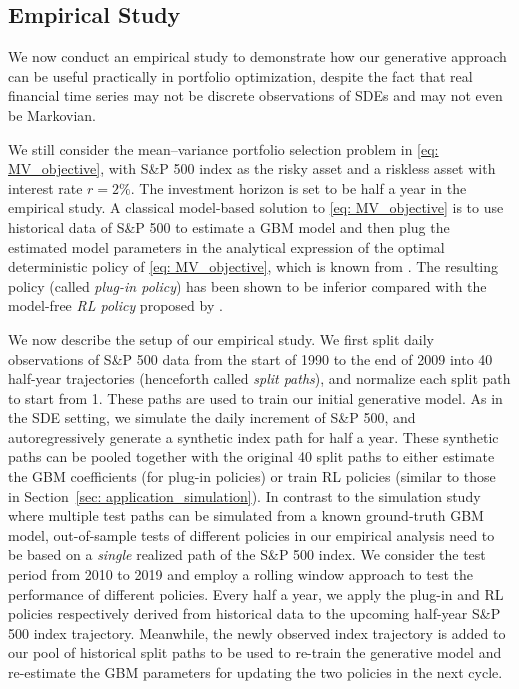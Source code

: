 \documentclass[11pt]{article}
\begin{document}
\subsection{Empirical Study}\label{sec: application_empirical}

We now conduct an empirical study to demonstrate how our generative approach can be useful practically in portfolio optimization, despite the fact that real financial time series may not be discrete observations of SDEs and may not even be Markovian.


We still consider the mean--variance portfolio selection problem in \eqref{eq: MV_objective}, with S\&P 500 index as the risky asset and a riskless asset with interest rate $r= 2\%$. The investment horizon is set to be half a year in the empirical study.
A classical model-based solution to \eqref{eq: MV_objective} is to use historical data of S\&P 500 to estimate a GBM model and then plug the estimated model parameters in the analytical expression of the optimal deterministic policy of \eqref{eq: MV_objective}, which is known from \cite{zhou2000continuous}. The resulting policy (called  \textit{plug-in policy}) has been shown to be inferior compared with the model-free \textit{RL policy} proposed by \cite{ jia2023q}.







We now describe the setup of our empirical study. We first split daily observations of S\&P 500 data from the start of 1990 to the end of 2009 into 40 half-year trajectories (henceforth called \textit{split paths}), and normalize each split path to start from 1. These paths are used to train our initial generative model. As in the SDE setting, we simulate the daily increment of S\&P 500, and autoregressively generate a synthetic index path for half a year. These synthetic paths can be pooled together with the original 40 split paths to either estimate the GBM coefficients (for plug-in policies) or train RL policies (similar to those in Section~\ref{sec: application_simulation}).
In contrast to the simulation study where multiple test paths can be simulated from a known ground-truth GBM model, out-of-sample tests of different policies in our empirical analysis need to be based on a {\it single} realized path of the S\&P 500 index. We consider the test period from 2010 to 2019 and  employ a rolling window approach to test the performance of different policies.
 Every half a year, we apply the plug-in and RL policies respectively derived from historical data to the upcoming half-year S\&P 500 index trajectory. Meanwhile, the newly observed index trajectory is added to our pool of historical split paths to be used to re-train the generative model and re-estimate the GBM parameters for updating the two policies in the next cycle. 
\end{document}
